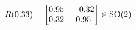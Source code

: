 \documentclass[preview]{standalone}
\begin{document}
\begin{align*}
\special{dvisvgm:raw <g id='unique000'>}R(0.33) = \begin{bmatrix} 0.95 & -0.32 \\ 0.32 & 0.95 \end{bmatrix} \in \text{SO}(2)\special{dvisvgm:raw </g>}
\end{align*}
\end{document}
